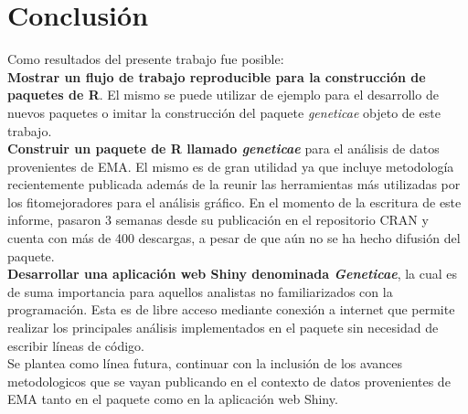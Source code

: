 \chapter{Conclusión}

Como resultados del presente trabajo fue posible:\\

\textbf{Mostrar un flujo de trabajo reproducible para la construcción de paquetes de R}. El mismo se puede utilizar de ejemplo para el desarrollo de nuevos paquetes o imitar la construcción del paquete \emph{geneticae} objeto de este trabajo. \\

\textbf{Construir un paquete de R llamado \emph{geneticae}} para el análisis de datos provenientes de EMA. El mismo es de gran utilidad ya que incluye metodología recientemente publicada además de la reunir las herramientas más utilizadas por los fitomejoradores para el análisis gráfico. En el momento de la escritura de este informe, pasaron 3 semanas desde su publicación en el repositorio CRAN y cuenta con más de 400 descargas, a pesar de que aún no se ha hecho difusión del paquete. \\

\textbf{Desarrollar una aplicación web Shiny denominada \emph{Geneticae}}, la cual es de suma importancia para aquellos analistas no familiarizados con la programación. Esta es de libre acceso mediante conexión a internet que permite realizar los principales análisis implementados en el paquete sin necesidad de escribir líneas de código. \\

Se plantea como línea futura, continuar con la inclusión de los avances metodologicos que se vayan publicando en el contexto de datos provenientes de EMA tanto en el paquete como en la aplicación web Shiny. 




